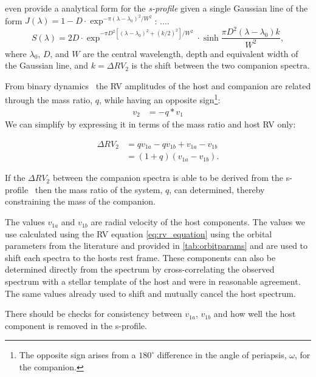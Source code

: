 \cite{ferluga_separating_1997} even provide a analytical form for the \emph{s-profile} given a single Gaussian line of the form
$J(\lambda) = 1- D \cdot\exp^{-\pi (\lambda - \lambda_0)^2 /W^2}$:
 ....\begin{equation}
 S(\lambda) = 2 D\cdot\exp^{-\pi D^2[(\lambda - \lambda_0)^2 +(k/2)^2]/W^2}\cdot \sinh{\frac{\pi D^2(\lambda-\lambda_0)k}{W^2}},\label{eqn:sprofile_gaussain}
 \end{equation}
where $\lambda_0$, $D$, and $W$ are the central wavelength, depth and equivalent width of the Gaussian line, and $k=\Delta {RV}_2 $ is the shift between the two companion spectra.


From binary dynamics~\citep[e.g.,][]{murray_keplerian_2010} the {RV} amplitudes of the host and companion are related through the mass ratio, \(q\), while having an opposite sign\footnote{The opposite sign arises from a \(180^\circ\) difference in the angle of periapsis, \(\omega\), for the companion.}:
\begin{align}
v_{2} &= -q * v_{1} \label{eqn:q_relation}
\end{align}
We can simplify  by expressing it in terms of the mass ratio and host {RV} only:

\begin{align}
\Delta RV_2 &= q v_{1a} - q v_{1b} + v_{1a} - v_{1b} \nonumber \\
&= (1 + q)(v_{1a} - v_{1b}). \label{eqn:companion_difference_simplified}
\end{align}

If the \(\Delta {RV}_2\) between the companion spectra is able to be derived from the s-profile~\citep[see][]{ferluga_separating_1997} then the mass ratio of the system, \(q\), can determined, thereby constraining the mass of the companion.

The values \(v_{1a}\) and \(v_{1b}\) are radial velocity of the host components. The values we use calculated using the RV equation \ref{eq:rv_equation} using the orbital parameters from the literature and provided in \ref{tab:orbitparams} and are used to shift each spectra to the hosts rest frame. These components can also be determined directly from the spectrum by cross-correlating the observed spectrum with a stellar template of the host and were in reasonable agreement. The same values already used to shift and mutually cancel the host spectrum.

There should be checks for consistency between \(v_{1a}\), \(v_{1b}\) and how well the host component is removed in the s-profile.

